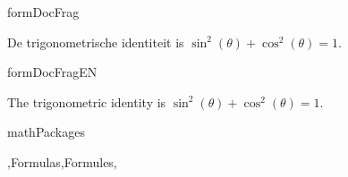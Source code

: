 
\begin{saveblock}{formDocFrag}
	\begin{highlightblock}[gobble=8,linewidth=25em,linewidth=\textwidth]
		De trigonometrische identiteit
		is $ \sin^2(\theta) + \cos^2(\theta) = 1 $.
	\end{highlightblock}
\end{saveblock}

\begin{saveblock}{formDocFragEN}
	\begin{highlightblock}[gobble=8,linewidth=25em,linewidth=\textwidth]
		The trigonometric identity
		is $ \sin^2(\theta) + \cos^2(\theta) = 1 $.
	\end{highlightblock}
\end{saveblock}

\begin{saveblock}{mathPackages}
	\begin{highlightblock}[gobble=8,linewidth=\textwidth]
		\usepackage{amsmath,amssymb}
		\usepackage{commath,mathtools}
	\end{highlightblock}
\end{saveblock}

\addtorecentlist{\$ \$}

\begin{frame}{\lang,Formulas,Formules,}
	\centering
	
	\vspace{10pt}
	\begin{center}%
	\end{center}

	\begin{center}
	\end{center}
\end{frame}
